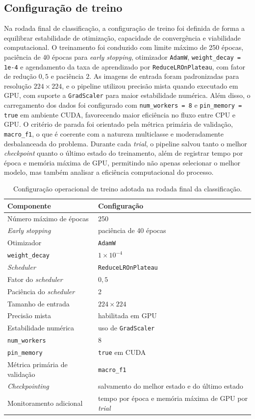 \documentclass[tcc,capa]{texufpel}
\begin{document}
\subsection{Configuração de treino} Na rodada final de classificação, a configuração de treino foi definida de forma a equilibrar estabilidade de otimização, capacidade de convergência e viabilidade computacional. O treinamento foi conduzido com limite máximo de 250 épocas, paciência de 40 épocas para \textit{early stopping}, otimizador \texttt{AdamW}, \texttt{weight\_decay = 1e-4} e agendamento da taxa de aprendizado por \texttt{ReduceLROnPlateau}, com fator de redução \(0{,}5\) e paciência \(2\). As imagens de entrada foram padronizadas para resolução \(224 \times 224\), e o pipeline utilizou precisão mista quando executado em GPU, com suporte a \texttt{GradScaler} para maior estabilidade numérica. Além disso, o carregamento dos dados foi configurado com \texttt{num\_workers = 8} e \texttt{pin\_memory = true} em ambiente CUDA, favorecendo maior eficiência no fluxo entre CPU e GPU. O critério de parada foi orientado pela métrica primária de validação, \texttt{macro\_f1}, o que é coerente com a natureza multiclasse e moderadamente desbalanceada do problema. Durante cada \textit{trial}, o pipeline salvou tanto o melhor \textit{checkpoint} quanto o último estado do treinamento, além de registrar tempo por época e memória máxima de GPU, permitindo não apenas selecionar o melhor modelo, mas também analisar a eficiência computacional do processo. \begin{table}[htbp] \centering \caption{Configuração operacional de treino adotada na rodada final da classificação.} \label{tab:training_config_classification} \begin{tabular}{p{5.0cm} p{8.3cm}} \hline \textbf{Componente} & \textbf{Configuração} \\[0.2cm] \hline Número máximo de épocas & 250 \\ \textit{Early stopping} & paciência de 40 épocas \\ Otimizador & \texttt{AdamW} \\ \texttt{weight\_decay} & \(1 \times 10^{-4}\) \\ \textit{Scheduler} & \texttt{ReduceLROnPlateau} \\ Fator do \textit{scheduler} & \(0{,}5\) \\ Paciência do \textit{scheduler} & 2 \\ Tamanho de entrada & \(224 \times 224\) \\ Precisão mista & habilitada em GPU \\ Estabilidade numérica & uso de \texttt{GradScaler} \\ \texttt{num\_workers} & 8 \\ \texttt{pin\_memory} & \texttt{true} em CUDA \\ Métrica primária de validação & \texttt{macro\_f1} \\ \textit{Checkpointing} & salvamento do melhor estado e do último estado \\ Monitoramento adicional & tempo por época e memória máxima de GPU por \textit{trial} \\ \hline \end{tabular} \end{table}
\end{document}
